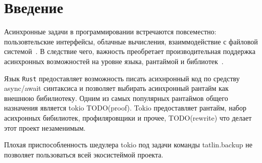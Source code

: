 
\section*{Введение}
\thispagestyle{withCompileDate}


Асинхронные задачи в программировании встречаются повсеместно: пользовтельские интерфейсы, облачные вычисления, взаиммодействие с файловой системой~\cite{ProAsyncDotNet}.
В следствие чего, важность преобретает производительная поддержка асинхронных возможностей на уровне языка, рантаймой и библиотек~\cite{AsyncRustProg}.

Язык \verb|Rust| предоставляет возможность писать асихнронный код по средству async/await синтаксиса и позволяет выбирать асинхронный рантайм как внешнюю бибилиотеку. Одним из самых популярных рантаймов общего назначения является tokio TODO(proof). Tokio предоставляет рантайм, набор асихронных бибилиотек, профиляровщики и прочее, TODO(rewrite) что делает этот проект незаменимым.

Плохая приспособленность шедулера tokio под задачи команды tatlin.backup не позволяет пользоваться всей экосистеймой проекта.